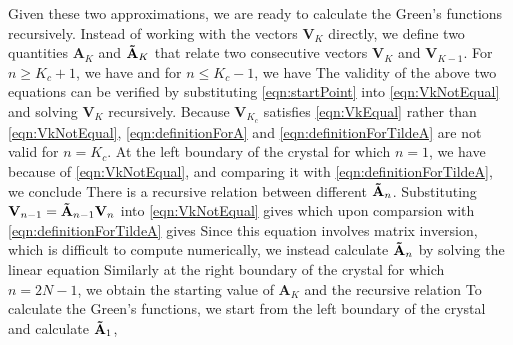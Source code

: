 Given these two approximations, we are ready to calculate the Green's functions
 recursively. Instead of working with the vectors $\mathbf{V}_{K}$ directly, we define two quantities 
$\mathbf{A}_{K}$ and $\mathbf{\Tilde{A}}_{K} $ that relate
two consecutive vectors $\mathbf{V}_{K}$ and $\mathbf{V}_{K-1}$. For $n \ge K_c + 1$, we have
and for $n \le K_c - 1$, we have
The validity of the above two equations can be verified by substituting \autoref{eqn:startPoint} into
 \autoref{eqn:VkNotEqual} and solving $\mathbf{V}_{K}$ recursively. Because $\mathbf{V}_{K_c}$ satisfies 
\autoref{eqn:VkEqual} rather than \autoref{eqn:VkNotEqual}, \autoref{eqn:definitionForA} and 
\autoref{eqn:definitionForTildeA} are not valid for $n = K_c$. At the left boundary of the crystal for which $n=1$, we have
because of \autoref{eqn:VkNotEqual}, and comparing it with \autoref{eqn:definitionForTildeA}, we conclude 
There is a recursive relation between different $\mathbf{\Tilde{A}}_{n}$. Substituting 
$\mathbf{V}_{n-1} = \mathbf{\Tilde{A}}_{n-1} \mathbf{V}_{n} $ into \autoref{eqn:VkNotEqual} gives
which upon comparsion with \autoref{eqn:definitionForTildeA} gives
Since this equation involves matrix inversion, which is difficult to compute numerically, we 
instead calculate
$\mathbf{\Tilde{A}}_{n}$ by solving the linear equation
Similarly at the right boundary of the crystal for which $n=2N-1$, we obtain the starting value of $\mathbf{A}_{K}$
and the recursive relation
To calculate the Green's functions, we  
start from the left boundary of the crystal and calculate $\mathbf{\Tilde{A}}_{1}$, 
